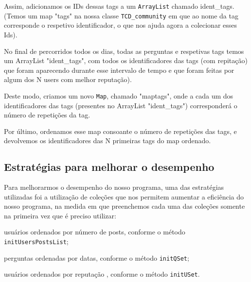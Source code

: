 \documentclass[a4paper]{article}
\begin{document}
Assim, adicionamos os IDs dessas tags a um \texttt{ArrayList} chamado ident\_tags.
(Temos um map "tags" na nossa classe \texttt{TCD\_community} em que ao nome da tag
corresponde o respetivo identificador, o que nos ajuda agora a colecionar esses
Ids).

No final de percorridos todos os dias, todas as perguntas e respetivas tags
temos um ArrayList "ident\_tags", com todos os identificadores das tags
(com repitação) que foram aparecendo durante
esse intervalo de tempo e que foram feitas por algum dos N users com melhor reputação).

Deste modo, criamos um novo \texttt{Map}, chamado "maptags", onde a cada um dos
identificadores das tags (presentes no ArrayList "ident\_tags") corresponderá o
número de repetições da tag.

Por último, ordenamos esse map consoante o número de repetições das tags, e
devolvemos os identificadores das N primeiras tags do map ordenado.



\subsection{Estratégias para melhorar o desempenho}
\label{sec:desempenho}

Para melhorarmos o desempenho do nosso programa, uma das estratégias utilizadas foi
a utilização de coleções que nos permitem aumentar a eficiência do nosso programa, na
medida em que preenchemos cada uma das coleções somente na primeira vez que é preciso
utilizar:
\begin{itemize}
\begin{item} usuários ordenados por número de posts, conforme o método \texttt{initUsersPostsList};\end{item}
\begin{item} perguntas ordenadas por datas, conforme o método \texttt{initQSet};\end{item}
\begin{item} usuários ordenados por reputação , conforme o método \texttt{initUSet}.\end{item}
\end{itemize}
\end{document}
